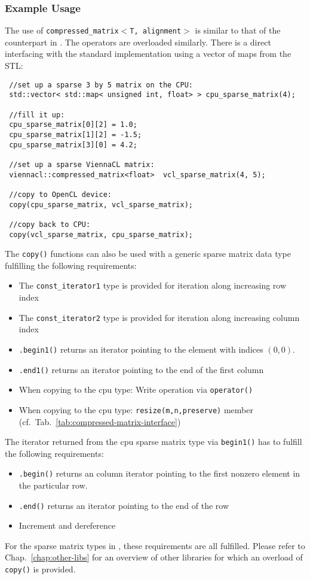 \subsubsection{Example Usage} \label{sec:compressed-matrix-example}
The use of \texttt{compressed\_matrix$<$T, alignment$>$} is similar to that of the counterpart in {\ublas}. The operators are overloaded similarly.
There is a direct interfacing with the standard implementation using a vector of maps from the STL:
\begin{lstlisting}
 //set up a sparse 3 by 5 matrix on the CPU:
 std::vector< std::map< unsigned int, float> > cpu_sparse_matrix(4);

 //fill it up:
 cpu_sparse_matrix[0][2] = 1.0; 
 cpu_sparse_matrix[1][2] = -1.5; 
 cpu_sparse_matrix[3][0] = 4.2; 

 //set up a sparse ViennaCL matrix:
 viennacl::compressed_matrix<float>  vcl_sparse_matrix(4, 5);

 //copy to OpenCL device:
 copy(cpu_sparse_matrix, vcl_sparse_matrix);

 //copy back to CPU:
 copy(vcl_sparse_matrix, cpu_sparse_matrix);
\end{lstlisting}
The \texttt{copy()} functions can also be used with a generic sparse matrix data type fulfilling the following requirements:
\begin{itemize}
 \item The \texttt{const\_iterator1} type is provided for iteration along increasing row index
 \item The \texttt{const\_iterator2} type is provided for iteration along increasing column index
 \item \texttt{.begin1()} returns an iterator pointing to the element with indices $(0,0)$.
 \item \texttt{.end1()} returns an iterator pointing to the end of the first column
 \item When copying to the cpu type: Write operation via \texttt{operator()}
 \item When copying to the cpu type: \texttt{resize(m,n,preserve)} member (cf.~Tab.~\ref{tab:compressed-matrix-interface})
\end{itemize}
The iterator returned from the cpu sparse matrix type via \texttt{begin1()} has to fulfill the following requirements:
\begin{itemize}
 \item \texttt{.begin()} returns an column iterator pointing to the first nonzero element in the particular row.
 \item \texttt{.end()} returns an iterator pointing to the end of the row
 \item Increment and dereference
\end{itemize}
For the sparse matrix types in {\ublas}, these requirements are all fulfilled. Please refer to Chap.~\ref{chap:other-libs} for an overview
of other libraries for which an overload of \texttt{copy()} is provided.

